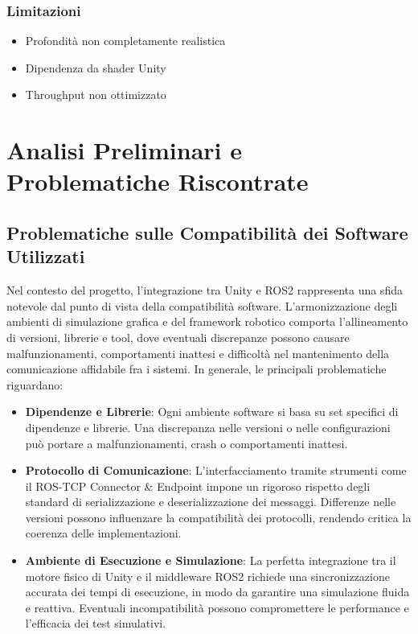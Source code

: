 \documentclass[11pt]{report}
\begin{document}
\subsection{Limitazioni}
\begin{itemize}
\item Profondità non completamente realistica
\item Dipendenza da shader Unity
\item Throughput non ottimizzato
\end{itemize}


\chapter{Analisi Preliminari e Problematiche Riscontrate}
\label{sec:Problemi}
\section{Problematiche sulle Compatibilità dei Software Utilizzati}
\label{sec:Problemi_Compatibilità}
Nel contesto del progetto, l’integrazione tra Unity e ROS2 rappresenta una sfida notevole dal punto di vista della compatibilità software. L’armonizzazione degli ambienti di simulazione grafica e del framework robotico comporta l’allineamento di versioni, librerie e tool, dove eventuali discrepanze possono causare malfunzionamenti, comportamenti inattesi e difficoltà nel mantenimento della comunicazione affidabile fra i sistemi. In generale, le principali problematiche riguardano:
\begin{itemize}
    \item \textbf{Dipendenze e Librerie}: Ogni ambiente software si basa su set specifici di dipendenze e librerie. Una discrepanza nelle versioni o nelle configurazioni può portare a malfunzionamenti, crash o comportamenti inattesi.

    \item \textbf{Protocollo di Comunicazione}: L’interfacciamento tramite strumenti come il ROS-TCP Connector \& Endpoint impone un rigoroso rispetto degli standard di serializzazione e deserializzazione dei messaggi. Differenze nelle versioni possono influenzare la compatibilità dei protocolli, rendendo critica la coerenza delle implementazioni.
    
    \item \textbf{Ambiente di Esecuzione e Simulazione}: La perfetta integrazione tra il motore fisico di Unity e il middleware ROS2 richiede una sincronizzazione accurata dei tempi di esecuzione, in modo da garantire una simulazione fluida e reattiva. Eventuali incompatibilità possono compromettere le performance e l’efficacia dei test simulativi.
\end{itemize}
\end{document}
